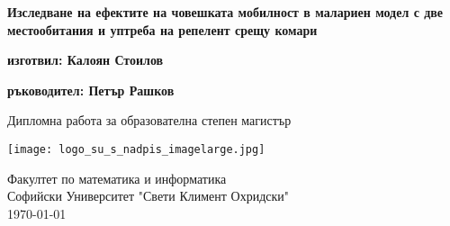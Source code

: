 \begin{titlepage}
  \begin{center}
    \vspace*{1cm}

    \Huge
    \textbf{Изследване на ефектите на човешката мобилност в малариен модел с две местообитания и уптреба на репелент срещу комари}


    \vspace{1.5cm}

    \textbf{изготвил: Калоян Стоилов}

    \vspace{0.8cm}

    \textbf{ръководител: Петър Рашков}

    \vfill

    Дипломна работа за образователна степен магистър

    \vspace{0.8cm}

    \texttt{[image: logo\_su\_s\_nadpis\_imagelarge.jpg]}

    \Large
    Факултет по математика и информатика\\
    Софийски Университет "Свети Климент Охридски"\\
    \today

  \end{center}
\end{titlepage}
